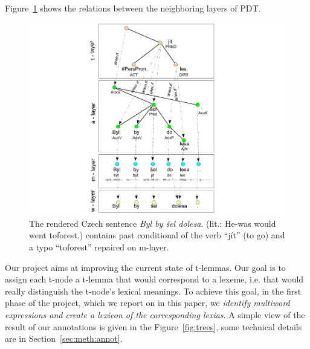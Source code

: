 Figure~\ref{fig:layers} shows the relations between the neighboring layers of PDT. 
\begin{figure}[htbp]
   \centering
   \includegraphics[scale=.38]{images/roviny.pdf} %
   \caption{The rendered Czech sentence \emph{Byl by šel dolesa}. (lit.: He-was would went toforest.) contains past conditional of the verb ``jít'' (to go) and a typo ``toforest'' repaired on m-layer.}
   \label{fig:layers}
\end{figure}

Our project aims at improving the current state of t-lemmas. Our goal is to assign each t-node a t-lemma that would correspond to a lexeme, i.e. that would really distinguish the t-node's lexical meanings. To achieve this goal, in the first phase of the project, which we report on in this paper, we \emph{identify multiword expressions and create a lexicon of the corresponding lexias}. A simple view of the result of our annotations is given in the Figure~\ref{fig:trees}, some technical details are in Section~\ref{sec:meth:annot}.



